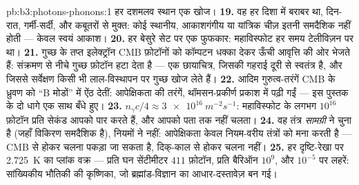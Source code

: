 \begin{solution}{pb:b3:photons-phonons:1}
हर दशमलव स्थान एक खोज।
\textbf{19.} वह हर दिशा में बराबर था, दिन-रात, गर्मी-सर्दी, और
कबूतरों से मुक्त: कोई स्थानीय, आकाशगंगीय या यांत्रिक चीज़ इतनी
समदैशिक नहीं होती --- केवल स्वयं आकाश।
\textbf{20.} हर बेसुरे सेट पर एक फुफकार: महाविस्फोट हर समय
टेलीविज़न पर था।
\textbf{21.} गुच्छ के तप्त इलेक्ट्रॉन CMB फ़ोटॉनों को कॉम्पटन
धक्का देकर ऊँची आवृत्ति की ओर भेजते हैं: संक्रमण से नीचे गुच्छ
फ़ोटॉन हटा देता है --- एक छायाचित्र, जिसकी गहराई दूरी से स्वतंत्र
है, और जिससे सर्वेक्षण किसी भी लाल-विस्थापन पर गुच्छ खोज लेते हैं।
\textbf{22.} आदिम गुरुत्व-तरंगें CMB के ध्रुवण को ``B मोडों'' में
ऐंठ देतीं: आपेक्षिकता की तरंगें, थॉमसन-प्रकीर्ण प्रकाश में पढ़ी
गईं --- इस पुस्तक के दो धागे एक साथ बँधे हुए।
\textbf{23.} $n_\gamma c/4 \approx \qty{3e16}{m^{-2}s^{-1}}$:
महाविस्फोट के लगभग $10^{16}$ फ़ोटॉन प्रति सेकंड आपको पार करते हैं,
और आपको पता तक नहीं चलता।
\textbf{24.} वह तंत्र \emph{सामग्री} ने चुना है (जहाँ विकिरण
समदैशिक है), नियमों ने नहीं: आपेक्षिकता केवल नियम-वरीय तंत्रों को
मना करती है --- CMB से होकर चलना पकड़ा जा सकता है, दिक्-काल से
होकर चलना नहीं।
\textbf{25.} हर दृष्टि-रेखा पर \qty{2.725}{K} का प्लांक वक्र
--- प्रति घन सेंटीमीटर $411$ फ़ोटॉन, प्रति बैरिऑन $10^9$,
और $10^{-5}$ पर लहरें: सांख्यिकीय भौतिकी की कृष्णिका, जो
ब्रह्मांड-विज्ञान का आधार-दस्तावेज़ बन गई।
\end{solution}
